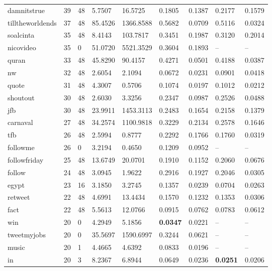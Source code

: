 \documentclass{llncs}
\begin{document}
\begin{table}[ht*]
\begin{tabular}{ l|l|l|l|l|l|l|l|l }
damnitstrue & 39 & 48 & 5.7507 & 16.5725 & 0.1805 & 0.1387 & 0.2177 & 0.1579 \\
tilltheworldends & 37 & 48 & 85.4526 & 1366.8588 & 0.5682 & 0.0709 & 0.5116 & 0.0324 \\
soalcinta & 35 & 48 & 8.4143 & 103.7817 & 0.3451 & 0.1987 & 0.3120 & 0.2014 \\
nicovideo & 35 & 0 & 51.0720 & 5521.3529 & 0.3604 & 0.1893 & -- & -- \\
quran & 33 & 48 & 45.8290 & 90.4157 & 0.4271 & 0.0501 & 0.4188 & 0.0387 \\
nw & 32 & 48 & 2.6054 & 2.1094 & 0.0672 & 0.0231 & 0.0901 & 0.0418 \\
quote & 31 & 48 & 4.3007 & 0.5706 & 0.1074 & 0.0197 & 0.1012 & 0.0212 \\
shoutout & 30 & 48 & 2.6030 & 3.3256 & 0.2347 & 0.0987 & 0.2526 & 0.0488 \\
jfb & 30 & 48 & 23.9911 & 1453.3113 & 0.2483 & 0.1654 & 0.2158 & 0.1379 \\
carnaval & 27 & 48 & 34.2574 & 1100.9818 & 0.3229 & 0.2134 & 0.2578 & 0.1646 \\
tfb & 26 & 48 & 2.5994 & 0.8777 & 0.2292 & 0.1766 & 0.1760 & 0.0319 \\
followme & 26 & 0 & 3.2194 & 0.4650 & 0.1209 & 0.0952 &	-- &	-- \\
followfriday & 25 & 48 & 13.6749 & 20.0701 & 0.1910 & 0.1152 & 0.2060 & 0.0676 \\
follow & 24 & 48 & 3.0945 & 1.9622 & 0.2916 & 0.1927 & 0.2046 & 0.0305 \\
egypt & 23 & 16 & 3.1850 & 3.2745 & 0.1357 & 0.0239 & 0.0704 & 0.0263 \\
retweet & 22 & 48 & 4.6991 & 13.4434 & 0.1570 & 0.1232 & 0.1353 & 0.0306 \\
fact & 22 & 48 & 5.5613 & 12.0766 & 0.0915 & 0.0762 & 0.0783 & 0.0612 \\
win & 20 & 0 & 4.2949 & 5.1856 & \textbf{0.0347} & 0.0221 & -- & -- \\
tweetmyjobs & 20 & 0 & 35.5697 & 1590.6997 & 0.3244 & 0.0621 & -- & -- \\
music & 20 & 1 & 4.4665 & 4.6392 & 0.0833 & 0.0196 & -- & -- \\
in & 20 & 3	& 8.2367 & 6.8944 & 0.0649 & 0.0236 & \textbf{0.0251} & 0.0206 \\

\end{tabular}
\end{table}
\end{document}
